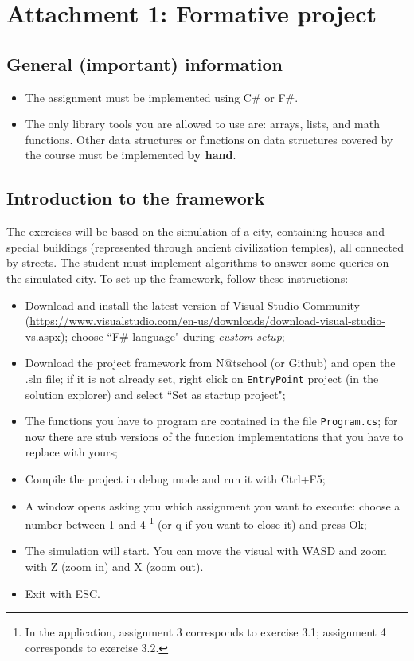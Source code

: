 \section*{Attachment 1: Formative project}

\subsection*{General (important) information}
\begin{itemize}
\item The assignment must be implemented using C\# or F\#.
\item The only library tools you are allowed to use are: arrays, lists, and math functions. Other data structures or functions on data structures covered by the course must be implemented \textbf{by hand}.
\end{itemize}

\subsection*{Introduction to the framework}
The exercises will be based on the simulation of a city, containing houses and special buildings (represented through ancient civilization temples), all connected by streets. The student must implement algorithms to answer some queries on the simulated city.
To set up the framework, follow these instructions:

\begin{itemize}
\item Download and install the latest version of Visual Studio Community (\url{https://www.visualstudio.com/en-us/downloads/download-visual-studio-vs.aspx}); choose ``F\# language" during \textit{custom setup}; 
\item Download the project framework from N@tschool (or Github) and open the .sln file; if it is not already set, right click on \texttt{EntryPoint} project (in the solution explorer) and select ``Set as startup project";
\item The functions you have to program are contained in the file \texttt{Program.cs}; for now there are stub versions of the function implementations that you have to replace with yours;
\item Compile the project in debug mode and run it with Ctrl+F5;
\item A window opens asking you which assignment you want to execute: choose a number between 1 and 4 \footnote{In the application, assignment 3 corresponds to exercise 3.1; assignment 4 corresponds to exercise 3.2.} (or q if you want to close it) and press Ok;
\item The simulation will start. You can move the visual with WASD and zoom with Z (zoom in) and X (zoom out).
\item Exit with ESC. 
\end{itemize}

